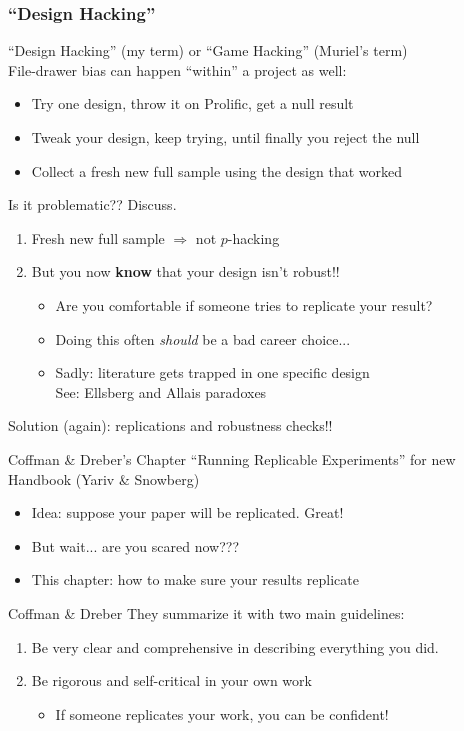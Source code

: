 \begin{frame}
\frametitle{``Design Hacking''}
``Design Hacking'' (my term) or ``Game Hacking'' (Muriel's term)\\
File-drawer bias can happen ``within'' a project as well:
\begin{itemize}
    \item Try one design, throw it on Prolific, get a null result
    \item Tweak your design, keep trying, until finally you reject the null
    \item Collect a fresh new full sample using the design that worked
\end{itemize}
\br
Is it problematic?? Discuss.
\pause
\begin{enumerate}
    \item Fresh new full sample $\Rightarrow$ not $p$-hacking
    \item But you now \textbf{know} that your design isn't robust!!
    \begin{itemize}
        \item Are you comfortable if someone tries to replicate your result?
        \item Doing this often \emph{should} be a bad career choice...
        \item Sadly: literature gets trapped in one specific design\\
        See: Ellsberg and Allais paradoxes
    \end{itemize}
\end{enumerate}
\br
Solution (again): replications and robustness checks!!
\end{frame}

\begin{frame}{Coffman \& Dreber's Chapter}
    ``Running Replicable Experiments'' for new Handbook (Yariv \& Snowberg)
    \begin{itemize}
        \item Idea: suppose your paper will be replicated. Great!
        \item But wait... are you scared now???
        \item This chapter: how to make sure your results replicate        
    \end{itemize}
\end{frame}

\begin{frame}{Coffman \& Dreber}
    They summarize it with two main guidelines:
    \begin{enumerate}
        \item Be very clear and comprehensive in describing everything you did.
        \item Be rigorous and self-critical in your own work
        \begin{itemize}
            \item If someone replicates your work, you can be confident!
        \end{itemize}
    \end{enumerate}
\end{frame}

